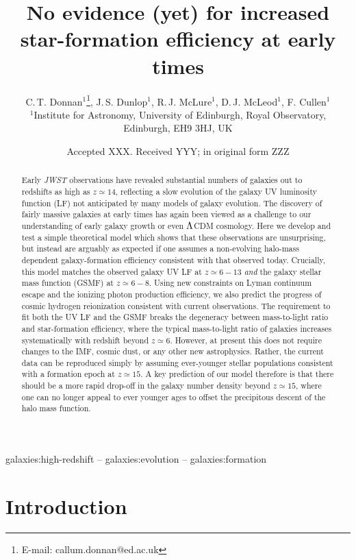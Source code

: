 \documentclass[fleqn,usenatbib]{mnras}
\title[A model of the GSMF and UV LF at early times]{No evidence (yet) for increased star-formation efficiency at early times}
\author[C.\,T. Donnan et al.]{C.\,T. Donnan$^{1}$\thanks{E-mail: callum.donnan@ed.ac.uk},
J.\,S. Dunlop$^{1}$,
R.\,J. McLure$^{1}$,
D.\,J. McLeod$^{1}$,
F. Cullen$^{1}$
\\
$^{1}$Institute for Astronomy, University of Edinburgh, Royal Observatory, Edinburgh, EH9 3HJ, UK
}
\date{Accepted XXX. Received YYY; in original form ZZZ}
\begin{document}
\label{firstpage}
\pagerange{\pageref{firstpage}--\pageref{lastpage}}
\maketitle


\begin{abstract}

Early {\it JWST} observations have revealed substantial numbers of galaxies out to redshifts as high as $z \simeq 14$, reflecting a slow evolution of the galaxy UV luminosity function (LF) not anticipated by many models of galaxy evolution. The discovery of fairly massive galaxies at early times has again been viewed as a challenge to our understanding of early galaxy growth or even ${\rm \Lambda}$CDM cosmology. Here we develop and test a simple theoretical model which shows that these observations are unsurprising, but instead are arguably as expected if one assumes a non-evolving halo-mass dependent galaxy-formation efficiency consistent with that observed today. Crucially, this model matches the observed galaxy UV LF at $z \simeq 6-13$ {\it and} the galaxy stellar mass function (GSMF) at $z \simeq 6-8$. Using new constraints on Lyman continuum escape and the ionizing photon production efficiency, we also predict the progress of cosmic hydrogen reionization consistent with current observations. The requirement to fit both the UV LF and the GSMF breaks the degeneracy between mass-to-light ratio and star-formation efficiency, where the typical mass-to-light ratio of galaxies increases systematically with redshift beyond $z \simeq 6$. However, at present this does not require changes to the IMF, cosmic dust, or any other new astrophysics. Rather, the current data can be reproduced simply by assuming ever-younger stellar populations consistent with a formation epoch at $z \simeq 15$. A key prediction of our model therefore is that there should be a more rapid drop-off in the galaxy number density beyond $z \simeq 15$, where one can no longer appeal to ever younger ages to offset the precipitous descent of the halo mass function.
\end{abstract}

\begin{keywords}
galaxies:high-redshift -- galaxies:evolution -- galaxies:formation
\end{keywords}



\section{Introduction}
\end{document}
